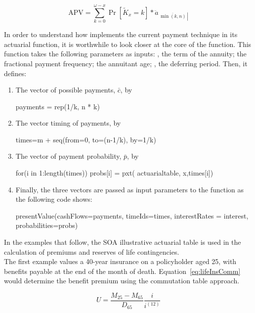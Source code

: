 \documentclass[nojss]{jss}
\begin{document}
\begin{equation}
\text{APV} = \sum\limits_{k = 0}^{\omega  - x} {\Pr \left[ \tilde K_x = k \right]*{\ddot a_{\left. {\overline {\, 
 {\min \left( k, n \right)} \,}}\! \right| }}} 
 \label{eq:anndueEVT}
\end{equation}

In order to understand how  implements the current
payment technique in its actuarial function, it is worthwhile to look closer at the core of the
 function. This function takes the following parameters as
inputs: , the term of the annuity;  the fractional payment frequency; 
 the annuitant age; , the deferring period. Then, it defines:
\begin{enumerate}
  \item The vector of possible payments, $\bar{c}$, by
    \begin{Code}
     payments = rep(1/k, n * k)
    \end{Code}
  \item The vector timing of payments, by
     \begin{Code}
     times=m + seq(from=0, to=(n-1/k), by=1/k)
     \end{Code}
   \item The vector of payment probability, $\bar{p}$, by
     \begin{Code}
     for(i in 1:length(times)) probs[i] = pxt(
     actuarialtable, x,times[i])
     \end{Code}
   \item Finally, the three vectors are passed as input parameters to the
    function as the following code shows:
   \begin{Code}
     presentValue(cashFlows=payments, timeIds=times, 
     interestRates = interest,
     probabilities=probs)
   \end{Code}
\end{enumerate}


In the examples that follow, the SOA illustrative actuarial 
table is used in the calculation of premiums and reserves of life contingencies.\\

The first example values a 40-year insurance on a policyholder aged 25,
with benefits payable at the end of the month of death. Equation~\ref{eq:lifeInsComm} would determine the
benefit premium using the commutation table approach.

\begin{equation}
U = \frac{M_{25} - M_{65}}{{{D_{65}}}}\frac{i}{{{i^{\left( {12}
\right)}}}}
\label{eq:lifeInsComm}
\end{equation}
\end{document}
